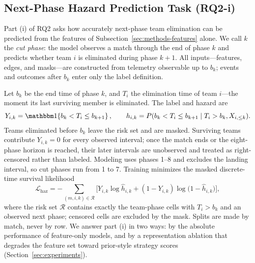 \subsection{Next-Phase Hazard Prediction Task (RQ2-i)}
\label{sec:prediction-task}

Part (i) of RQ2 asks how accurately next-phase team elimination can be
predicted from the features of Subsection~\ref{sec:methods-features} alone.
We call \(k\) the \textit{cut phase}: the model observes a match through the
end of phase \(k\) and predicts whether team \(i\) is eliminated during phase
\(k{+}1\). All inputs---features, edges, and masks---are constructed from
telemetry observable up to \(b_k\); events and outcomes after \(b_k\) enter
only the label definition.

Let \(b_k\) be the end time of phase \(k\), and \(T_i\) the elimination time
of team \(i\)---the moment its last surviving member is eliminated. The label
and hazard are
\[
Y_{i,k}=\Ind\!\left\{b_k < T_i \leq b_{k+1}\right\}, \qquad
h_{i,k}=P(b_k < T_i \leq b_{k+1}\mid T_i>b_k, X_{i,\leq k}).
\]
Teams eliminated before \(b_k\) leave the risk set and are masked. Surviving
teams contribute \(Y_{i,k}=0\) for every observed interval; once the match
ends or the eight-phase horizon is reached, their later intervals are
unobserved and treated as right-censored rather than labeled. Modeling uses
phases 1--8 and excludes the landing interval, so cut phases run from 1 to 7.
Training minimizes the masked discrete-time survival likelihood
\[
\mathcal{L}_{\mathrm{haz}}
= -\sum_{(m,i,k)\in \mathcal{R}}
\Big[ Y_{i,k}\log \hat h_{i,k} + (1-Y_{i,k})\log\big(1-\hat h_{i,k}\big) \Big],
\]
where the risk set \(\mathcal{R}\) contains exactly the team-phase cells with
\(T_i>b_k\) and an observed next phase; censored cells are excluded by the
mask. Splits are made by match, never by row. We answer part (i) in two ways:
by the absolute performance of feature-only models, and by a representation
ablation that degrades the feature set toward prior-style strategy scores
(Section~\ref{sec:experiments}).
